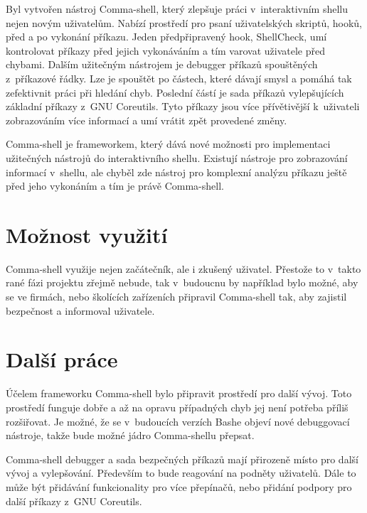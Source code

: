 \documentclass[thesis=M,czech]{FITthesis}[2012/06/26]
\begin{document}
\begin{conclusion}

Byl vytvořen nástroj Comma-shell, který zlepšuje práci v~interaktivním shellu nejen novým uživatelům. Nabízí prostředí pro psaní uživatelských skriptů, hooků, před a po vykonání příkazu. Jeden předpřipravený hook, ShellCheck, umí kontrolovat příkazy před jejich vykonáváním a tím varovat uživatele před chybami. Dalším užitečným nástrojem je debugger příkazů spouštěných z~příkazové řádky. Lze je spouštět po částech, které dávají smysl a pomáhá tak zefektivnit práci při hledání chyb. Poslední částí je sada příkazů vylepšujících základní příkazy z~GNU Coreutils. Tyto příkazy jsou více přívětivější k~uživateli zobrazováním více informací a umí vrátit zpět provedené změny.

Comma-shell je frameworkem, který dává nové možnosti pro implementaci užitečných nástrojů do interaktivního shellu. Existují nástroje pro zobrazování informací v~shellu, ale chyběl zde nástroj pro komplexní analýzu příkazu ještě před jeho vykonáním a tím je právě Comma-shell.


\section{Možnost využití}

Comma-shell využije nejen začátečník, ale i zkušený uživatel. Přestože to v~takto rané fázi projektu zřejmě nebude, tak v~budoucnu by například bylo možné, aby se ve firmách, nebo školících zařízeních připravil Comma-shell tak, aby zajistil bezpečnost a informoval uživatele.


\section{Další práce}

Účelem frameworku Comma-shell bylo připravit prostředí pro další vývoj. Toto prostředí funguje dobře a až na opravu případných chyb jej není potřeba příliš rozšiřovat. Je možné, že se v~budoucích verzích Bashe objeví nové debuggovací nástroje, takže bude možné jádro Comma-shellu přepsat.

Comma-shell debugger a sada bezpečných příkazů mají přirozeně místo pro další vývoj a vylepšování. Především to bude reagování na podněty uživatelů. Dále to může být přidávání funkcionality pro více přepínačů, nebo přidání podpory pro další příkazy z~GNU Coreutils.


\end{conclusion}
\end{document}
